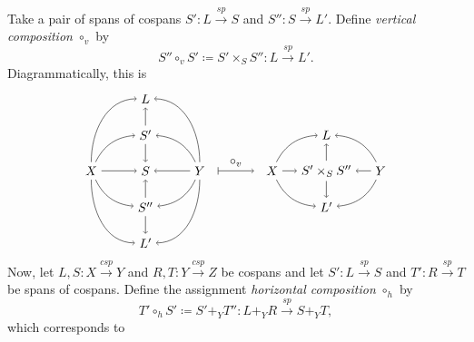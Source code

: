 \documentclass[11pt]{amsart}
\newcommand{\from}{\colon}
\renewcommand{\span}{\xrightarrow{\mathit{sp}}}
\newcommand{\cospan}{\xrightarrow{\mathit{csp}}}
\theoremstyle{remark}
\theoremstyle{definition}
\begin{document}
Take a pair of spans of cospans $S' \from L \span S$ and $S'' \from S \span L'$. Define \textit{vertical composition} $\circ_v$ by 
%
\begin{equation}
\label{eq.VertComp}
	S'' \circ_v S' \coloneqq S' \times_S S'' \from L \span L'.
\end{equation}
%
Diagrammatically, this is
\[
\begin{tikzpicture}
	\node (X) at (-4,0) {$X$};
	\node (Y) at (-1,0) {$Y$};
	\node (L) at (-2.5,2) {$L$};
	\node (S') at (-2.5,1) {$S'$};
	\node (S) at (-2.5,0) {$S$};
	\node (S'') at (-2.5,-1) {$S''$};
	\node (L') at (-2.5,-2) {$L'$};
	\draw [->] (X) edge[out=90,in=180] (L);
	\draw [->] (X) edge[bend left=30] (S');
	\draw [->] (X) edge (S);
	\draw [->] (X) edge[bend right=30] (S'');
	\draw [->] (X) edge[out=-90,in=180] (L');
	\draw [->] (Y) edge[out=90,in=0] (L);
	\draw [->] (Y) edge[bend right=30] (S');
	\draw [->] (Y) edge (S);
	\draw [->] (Y) edge[bend left=30] (S'');
	\draw [->] (Y) edge[out=-90,in=0] (L');
	\draw [->] (S') edge (L);
	\draw [->] (S') edge (S);
	\draw [->] (S'') edge (S);
	\draw [->] (S'') edge (L');
	\draw [|->] (-0.5,0) -- node[above] {$\circ_v$} (0.5,0);
	\node (X) at (1,0) {$X$};
	\node (Y) at (4,0) {$Y$};
	\node (L) at (2.5,1) {$L$};
	\node (L') at (2.5,-1) {$L'$};
	\node (Spb) at (2.5,0) {$S' \times_S S''$};
	\draw [->] (X) edge[bend left=30] (L);
	\draw [->] (X) edge[] (Spb);
	\draw [->] (X) edge[bend right=30] (L');
	\draw [->] (Y) edge[bend right=30] (L);
	\draw [->] (Y) edge[] (Spb);
	\draw [->] (Y) edge[bend left=30] (L');
	\draw [->] (Spb) edge[] (L);
	\draw [->] (Spb) edge[] (L');
\end{tikzpicture}
\]
Now, let $L,S \from X \cospan Y$ and $R,T \from Y \cospan Z$ be cospans and let $S' \from L \span S$ and $T' \from R \span T$ be spans of cospans.  Define the assignment \textit{horizontal composition} $\circ_h$ by 
\begin{equation}
\label{eq.HorComp}
	T' \circ_h S' \coloneqq S' +_Y T'' \from L +_Y R \span S +_Y T,
\end{equation} 
which corresponds to 
\end{document}
